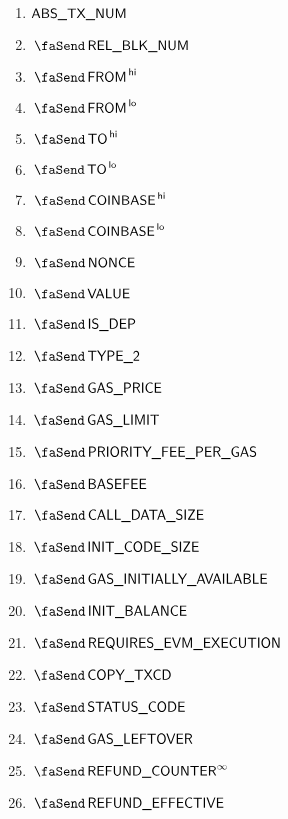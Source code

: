 \begin{description}
\begin{multicols}{3}
			\begin{enumerate}
				\item $\textsf{ABS\_TX\_NUM}$
				\item $\txBatchNum$
				\item $\txFrom\high$
				\item $\txFrom\low$
				\item $\txTo\high$
				\item $\txTo\low$
				\item $\txCoinbase\high$
				\item $\txCoinbase\low$
				\item $\txNonce$
				\item $\txValue$
				\item $\txIsDeployment$
				\item $\txIsTypeTwo$
				\item $\txGasPrice$
				\item $\txGasLimit$
				\item $\txPriorityFeePerGas$
				\item $\txBasefee$
				\item $\txCallDataSize$
				\item $\txInitCodeSize$
				\item $\txInitialGas$
				\item $\txInitialBalance$
				\item $\txRequiresEvmExecution$
				\item $\txCopyTxcd$ 
				\item $\txStatusCode$
				\item $\txLeftoverGas$
				\item $\txFinalRefundCounter$
				\item $\txEffectiveRefund$
			\end{enumerate}
		\end{multicols}
\end{description}
